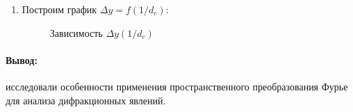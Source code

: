 \documentclass[12pt]{article}
\begin{document}
\begin{enumerate}
    
    \item Построим график $\Delta y = f(1/d_c)$:
    \begin{figure}[h!]
    \noindent{}
    \caption{Зависимость $\Delta y(1/d_c)$}
\end{figure}
    
\end{enumerate}

\newpage

\paragraph{Вывод:} исследовали особенности применения пространственного преобразования Фурье для анализа дифракционных явлений.
\end{document}
